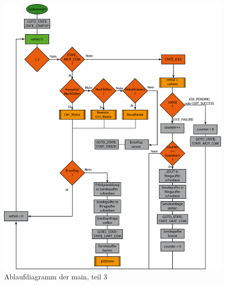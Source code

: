 \begin{figure}[h]
\includegraphics[scale = 0.8]{./main3.png}
\hspace{-14pt}
\caption{Ablaufdiagramm der main, teil 3}
\end{figure} 


